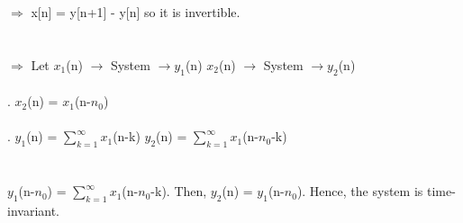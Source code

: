 \documentclass[10pt,a4paper, margin=1in]{article}
\begin{document}
\begin{enumerate}
\begin{enumerate}
    $\Rightarrow$ x[n] = y[n+1] - y[n] so it is invertible.\\\\\\
    $\Rightarrow$ Let $x_{1}$(n) $\rightarrow$  System $\rightarrow y_{1}$(n) \hspace{5cm} $x_{2}$(n) $\rightarrow$  System $\rightarrow y_{2}$(n)\\\\
    .\hspace{10.3cm} $x_{2}$(n) = $x_{1}$(n-$n_{0}$)\\\\
    .\hspace{0.7cm} $y_{1}$(n) = $\sum_{k=1}^{\infty} x_{1}$(n-k) \hspace{5.7cm} $y_{2}$(n) = $\sum_{k=1}^{\infty} x_{1}$(n-$n_{0}$-k)\\\\\\
    $y_{1}$(n-$n_{0}$) = $\sum_{k=1}^{\infty} x_{1}$(n-$n_{0}$-k). Then, $y_{2}$(n) =  $y_{1}$(n-$n_{0}$). Hence, the system is time-invariant.\\\\
  
    \end{enumerate}

\end{enumerate}
\end{document}

